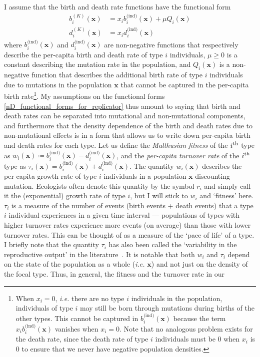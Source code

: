 I assume that the birth and death rate functions have the functional form
\begin{equation}
\label{nD_functional_forms_for_replicator}
\begin{aligned}
b^{(K)}_i(\mathbf{x}) &= x_ib^{\textrm{(ind)}}_{i}(\mathbf{x}) + \mu Q_i(\mathbf{x})\\
d^{(K)}_i(\mathbf{x}) &= x_id^{\textrm{(ind)}}_i(\mathbf{x})
\end{aligned}
\end{equation}
where $b^{\textrm{(ind)}}_{i}(\mathbf{x})$ and $d^{\textrm{(ind)}}_{i}(\mathbf{x})$ are non-negative functions that respectively describe the per-capita birth and death rate of type $i$ individuals, $\mu \geq 0$ is a constant describing the mutation rate in the population, and $Q_i(\mathbf{x})$ is a non-negative function that describes the additional birth rate of type $i$ individuals due to mutations in the population $\mathbf{x}$ that cannot be captured in the per-capita birth rate\footnote{When $x_i = 0$, \emph{i.e.} there are no type $i$ individuals in the population, individuals of type $i$ may still be born through mutations during births of the other types. This cannot be captured in $b^{\textrm{(ind)}}_{i}(\mathbf{x})$ because the term $x_ib^{\textrm{(ind)}}_{i}(\mathbf{x})$ vanishes when $x_i = 0$. Note that no analogous problem exists for the death rate, since the death rate of type $i$ individuals must be 0 when $x_i$ is 0 to ensure that we never have negative population densities.}. My assumptions on the functional forms \eqref{nD_functional_forms_for_replicator} thus amount to saying that birth and death rates can be separated into mutational and non-mutational components, and furthermore that the density dependence of the birth and death rates due to non-mutational effects is in a form that allows us to write down per-capita birth and death rates for each type. Let us define the \emph{Malthusian fitness} of the $i\textsuperscript{th}$ type as $w_i(\mathbf{x}) \coloneqq b^{\textrm{(ind)}}_{i}(\mathbf{x}) - d^{\textrm{(ind)}}_{i}(\mathbf{x})$, and the \emph{per-capita turnover rate} of the $i\textsuperscript{th}$ type as $\tau_i(\mathbf{x}) = b^{\textrm{(ind)}}_{i}(\mathbf{x}) + d^{\textrm{(ind)}}_{i}(\mathbf{x})$.  The quantity $w_i(\mathbf{x})$ describes the per-capita growth rate of type $i$ individuals in a population $\mathbf{x}$ discounting mutation. Ecologists often denote this quantity by the symbol $r_i$ and simply call it the (exponential) growth rate of type $i$, but I will stick to $w_i$ and `fitness' here. $\tau_i$ is a measure of the number of events (birth events + death events) that a type $i$ individual experiences in a given time interval ---  populations of types with higher turnover rates experience more events (on average) than those with lower turnover rates. This can be thought of as a measure of the `pace of life' of a type. I briefly note that the quantity $\tau_i$ has also been called the `variability in the reproductive output' in the literature~\citep{gillespie_natural_1974}. It is notable that both $w_i$ and $\tau_i$ depend on the state of the population as a whole (\textit{i.e.} $\mathbf{x}$) and not just on the density of the focal type. Thus, in general, the fitness and the turnover rate in our 